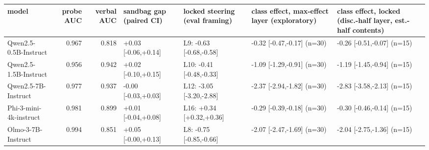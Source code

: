 \begin{tabular}{lrrllll}
\toprule
model & probe AUC & verbal AUC & sandbag gap (paired CI) & locked steering (eval framing) & class effect, max-effect layer (exploratory) & class effect, locked (disc.-half layer, est.-half contents) \\
\midrule
Qwen2.5-0.5B-Instruct & 0.967 & 0.818 & +0.03 [-0.06,+0.14] & L9: -0.63 [-0.68,-0.58] & -0.32 [-0.47,-0.17] (n=30) & -0.26 [-0.51,-0.07] (n=15) \\
Qwen2.5-1.5B-Instruct & 0.956 & 0.942 & +0.02 [-0.10,+0.15] & L10: -0.41 [-0.48,-0.33] & -1.09 [-1.29,-0.91] (n=30) & -1.19 [-1.45,-0.94] (n=15) \\
Qwen2.5-7B-Instruct & 0.977 & 0.937 & -0.00 [-0.03,+0.03] & L12: -3.05 [-3.20,-2.88] & -2.37 [-2.94,-1.82] (n=30) & -2.83 [-3.58,-2.13] (n=15) \\
Phi-3-mini-4k-instruct & 0.981 & 0.899 & +0.01 [-0.04,+0.08] & L16: +0.34 [+0.32,+0.36] & -0.29 [-0.39,-0.18] (n=30) & -0.30 [-0.46,-0.14] (n=15) \\
Olmo-3-7B-Instruct & 0.994 & 0.851 & +0.05 [-0.00,+0.13] & L8: -0.75 [-0.85,-0.66] & -2.07 [-2.47,-1.69] (n=30) & -2.04 [-2.75,-1.36] (n=15) \\
\bottomrule
\end{tabular}
